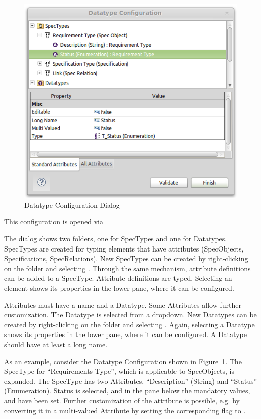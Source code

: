 \begin{figure}
\centering     
\includegraphics[width=0.8\linewidth]{../rmf-images/pror_datatype_configuration.png}
\caption{Datatype Configuration Dialog}      
\label{fig:DatatypeConfig}
\end{figure}

This configuration is opened via 

The dialog shows two folders, one for SpecTypes and one for Datatypes.
SpecTypes are created for typing elements that have attributes
(SpecObjects, Specifications, SpecRelations).  New SpecTypes can be
created by right-clicking on the folder and selecting .
Through the same mechanism, attribute definitions can be added to a
SpecType.  Attribute definitions are typed.  Selecting an element shows
its properties in the lower pane, where it can be configured.

Attributes must have a name and a Datatype.  Some Attributes
allow further customization.  The Datatype is selected from a
dropdown.  New Datatypes can be created by right-clicking on the folder
 and selecting .  Again, selecting a Datatype
shows its properties in the lower pane, where it can be configured.  A
Datatype should have at least a long name.

As an example, consider the Datatype Configuration shown in Figure~\ref{fig:DatatypeConfig}.
The SpecType for ``Requirements Type'', which is applicable to
SpecObjects, is expanded.  The SpecType has two Attributes,
``Description'' (String) and ``Status'' (Enumeration).  Status is
selected, and in the pane below the mandatory values,  and
 have been set.  Further customization of the attribute is
possible, e.g.  by converting it in a multi-valued Attribute by setting
the corresponding flag to .

